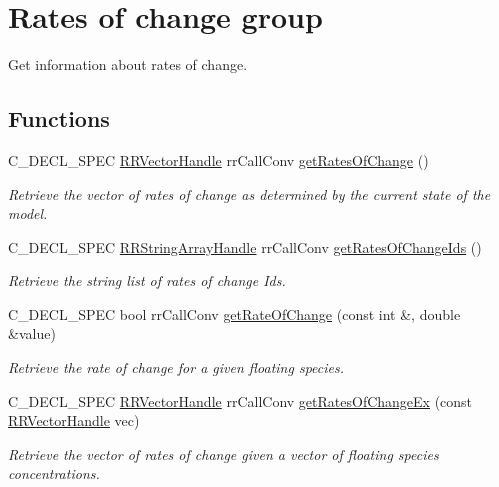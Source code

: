 \hypertarget{group__rate_of_change}{
\section{\-Rates of change group}
\label{group__rate_of_change}
}


\-Get information about rates of change.  


\subsection*{\-Functions}
\begin{DoxyCompactItemize}
\item 
\-C\-\_\-\-D\-E\-C\-L\-\_\-\-S\-P\-E\-C \hyperlink{rr__c__types_8h_aea46a16752b0ae2cd95c009030ee630e}{\-R\-R\-Vector\-Handle} \*
rr\-Call\-Conv \hyperlink{group__rate_of_change_gabbe129bee63761f7b0f98f060b86067b}{get\-Rates\-Of\-Change} ()
\begin{DoxyCompactList}\small\item\em \-Retrieve the vector of rates of change as determined by the current state of the model. \end{DoxyCompactList}\item 
\-C\-\_\-\-D\-E\-C\-L\-\_\-\-S\-P\-E\-C \*
\hyperlink{rr__c__types_8h_a90941a6a2247bf7a8ec3d429729c5f9a}{\-R\-R\-String\-Array\-Handle} rr\-Call\-Conv \hyperlink{group__rate_of_change_ga1a87e2a6db4adb19a11a6a893eca74d8}{get\-Rates\-Of\-Change\-Ids} ()
\begin{DoxyCompactList}\small\item\em \-Retrieve the string list of rates of change \-Ids. \end{DoxyCompactList}\item 
\-C\-\_\-\-D\-E\-C\-L\-\_\-\-S\-P\-E\-C bool rr\-Call\-Conv \hyperlink{group__rate_of_change_gaad38321993112e230f7fccd96345de6c}{get\-Rate\-Of\-Change} (const int \&, double \&value)
\begin{DoxyCompactList}\small\item\em \-Retrieve the rate of change for a given floating species. \end{DoxyCompactList}\item 
\-C\-\_\-\-D\-E\-C\-L\-\_\-\-S\-P\-E\-C \hyperlink{rr__c__types_8h_aea46a16752b0ae2cd95c009030ee630e}{\-R\-R\-Vector\-Handle} \*
rr\-Call\-Conv \hyperlink{group__rate_of_change_gacfae48e32754e7678b8bb003df93ef53}{get\-Rates\-Of\-Change\-Ex} (const \hyperlink{rr__c__types_8h_aea46a16752b0ae2cd95c009030ee630e}{\-R\-R\-Vector\-Handle} vec)
\begin{DoxyCompactList}\small\item\em \-Retrieve the vector of rates of change given a vector of floating species concentrations. \end{DoxyCompactList}\end{DoxyCompactItemize}


